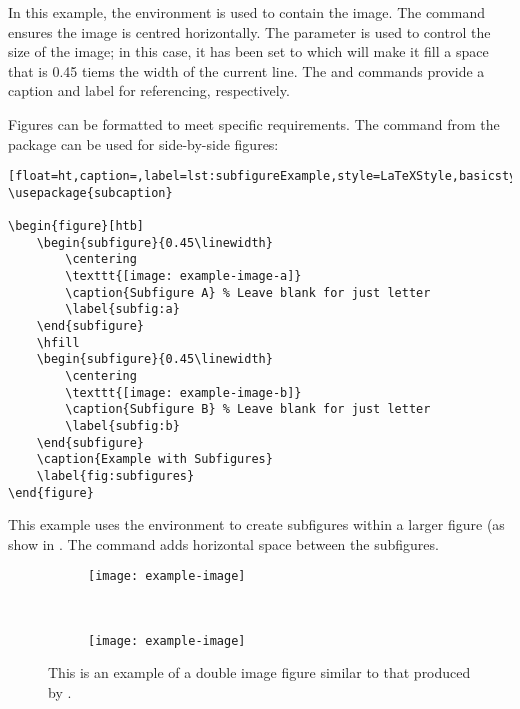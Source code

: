 		In this example, the  environment is used to contain the image. 
		The  command ensures the image is centred horizontally. 
		The  parameter is used to control the size of the image; in this case, it has been set to  which will make it fill a space that is 0.45 tiems the width of the current line.
		The  and  commands provide a caption and label for referencing, respectively.

		Figures can be formatted to meet specific requirements. 
		The  command from the  package can be used for side-by-side figures:

		\begin{lstlisting}[float=ht,caption=,label=lst:subfigureExample,style=LaTeXStyle,basicstyle=\small\ttfamily,]
\usepackage{subcaption}

\begin{figure}[htb]
	\begin{subfigure}{0.45\linewidth}
		\centering
		\texttt{[image: example-image-a]}
		\caption{Subfigure A} % Leave blank for just letter
		\label{subfig:a}
	\end{subfigure}
	\hfill
	\begin{subfigure}{0.45\linewidth}
		\centering
		\texttt{[image: example-image-b]}
		\caption{Subfigure B} % Leave blank for just letter
		\label{subfig:b}
	\end{subfigure}
	\caption{Example with Subfigures}
	\label{fig:subfigures}
\end{figure}
		\end{lstlisting}

		This example uses the  environment to create subfigures within a larger figure (as show in . 
		The  command adds horizontal space between the subfigures.

		\begin{figure}[H]
			\centering
			\begin{subfigure}{0.45\linewidth}
				\texttt{[image: example-image]}
				\caption{} %
				\label{fig:doubleImage:a}
			\end{subfigure}
			~
			\begin{subfigure}{0.45\linewidth}
				\texttt{[image: example-image]}
				\caption{} %
				\label{fig:doubleImage:b}
			\end{subfigure}
			\caption{This is an example of a double image figure similar to that produced by .}
			\label{fig:doubleImage}
		\end{figure}

